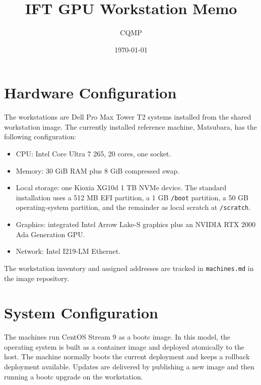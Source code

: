 \documentclass[11pt,a4paper]{article}
\title{\Large\bfseries IFT GPU Workstation Memo}
\author{CQMP}
\date{\today}
\begin{document}
\maketitle

\section{Hardware Configuration}
\label{sec:hardware}

The workstations are Dell Pro Max Tower T2 systems installed from the shared
workstation image.  The currently installed reference machine, Matsubara, has
the following configuration:

\begin{itemize}
  \item CPU: Intel Core Ultra 7 265, 20 cores, one socket.
  \item Memory: 30 GiB RAM plus 8 GiB compressed swap.
  \item Local storage: one Kioxia XG10d 1 TB NVMe device.  The standard
        installation uses a 512 MB EFI partition, a 1 GB \texttt{/boot}
        partition, a 50 GB operating-system partition, and the remainder as
        local scratch at \texttt{/scratch}.
  \item Graphics: integrated Intel Arrow Lake-S graphics plus an NVIDIA
        RTX 2000 Ada Generation GPU.
  \item Network: Intel I219-LM Ethernet.
\end{itemize}

The workstation inventory and assigned addresses are tracked in
\texttt{machines.md} in the image repository.

\section{System Configuration}
\label{sec:system}

The machines run CentOS Stream 9 as a bootc image.  In this model, the
operating system is built as a container image and deployed atomically to the
host.  The machine normally boots the current deployment and keeps a rollback
deployment available.  Updates are delivered by publishing a new image and then
running a bootc upgrade on the workstation.
\end{document}
